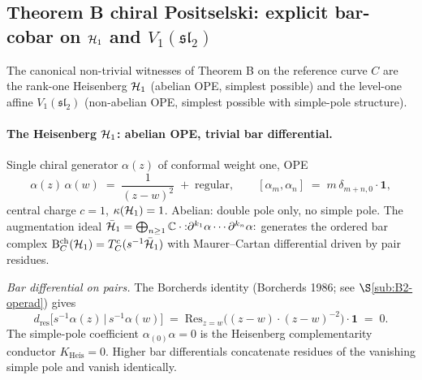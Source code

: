 \subsection{Theorem B chiral Positselski: explicit bar-cobar on $\mathcal{H}_1$ and $V_1(\mathfrak{sl}_2)$}
\label{subsec:voa-theorem-B-bar-cobar}

The canonical non-trivial witnesses of Theorem B on the reference
curve $C$ are the rank-one Heisenberg $\mathcal{H}_1$ (abelian OPE, simplest
possible) and the level-one affine $V_1(\mathfrak{sl}_2)$ (non-abelian
OPE, simplest possible with simple-pole structure).

\paragraph{The Heisenberg $\mathcal{H}_1$: abelian OPE, trivial bar differential.}
Single chiral generator $\alpha(z)$ of conformal weight one, OPE
\begin{equation}
\label{eq:voa-heis-ope}
  \alpha(z)\,\alpha(w) \;=\; \frac{1}{(z-w)^2} \;+\; \mathrm{regular}, \qquad
  [\alpha_m, \alpha_n] \;=\; m\,\delta_{m+n, 0}\cdot\mathbf{1},
\end{equation}
central charge $c = 1$, $\kappa(\mathcal{H}_1) = 1$. Abelian: double pole only,
no simple pole. The augmentation ideal
$\bar{\mathcal{H}}_1 = \bigoplus_{n \geq 1}\mathbb{C}\cdot{:}\partial^{k_1}\alpha\cdots\partial^{k_n}\alpha{:}$
generates the ordered bar complex
$\mathrm{B}^{\mathrm{ch}}_C(\mathcal{H}_1) = T^c_C(s^{-1}\bar{\mathcal{H}}_1)$ with
Maurer--Cartan differential driven by pair residues.

\emph{Bar differential on pairs.} The Borcherds identity
(Borcherds 1986; see $\S$\ref{sub:B2-operad}) gives
\begin{equation}
\label{eq:voa-heis-bar-diff}
  d_{\mathrm{res}}\bigl[s^{-1}\alpha(z)\,|\,s^{-1}\alpha(w)\bigr]
  \;=\; \mathrm{Res}_{z = w}\bigl((z-w)\cdot (z-w)^{-2}\bigr)\cdot\mathbf{1}
  \;=\; 0.
\end{equation}
The simple-pole coefficient $\alpha_{(0)}\alpha = 0$ is the Heisenberg
complementarity conductor $K_{\mathrm{Heis}} = 0$. Higher bar
differentials concatenate residues of the vanishing simple pole and
vanish identically.

